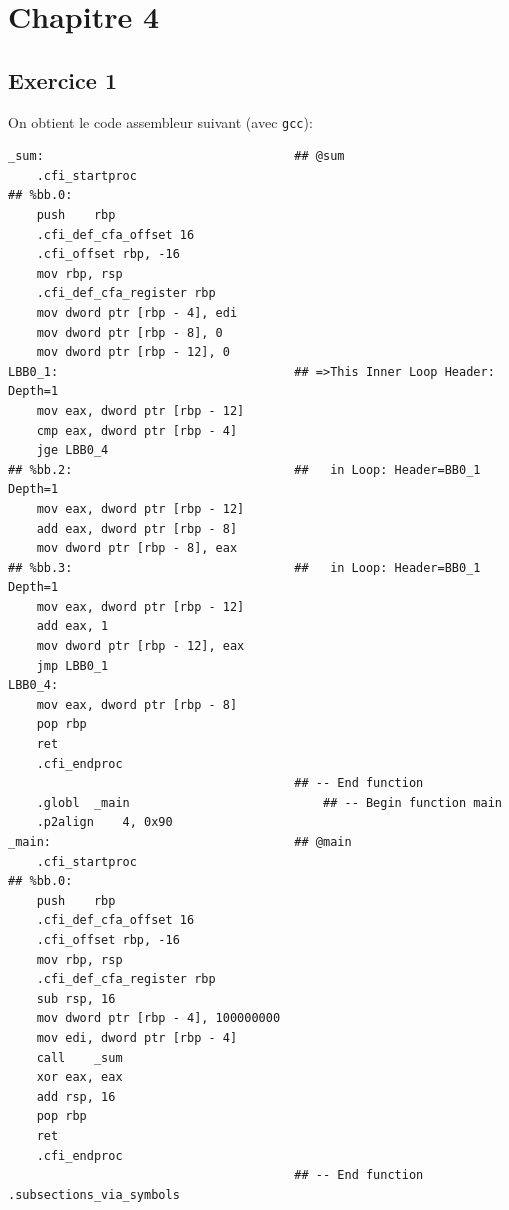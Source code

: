 \documentclass[11pt, a4 paper]{article}
\begin{document}
\begin{figure}[!h]
\end{figure}

\section{Chapitre 4}
\subsection{Exercice 1}
On obtient le code assembleur suivant (avec \texttt{gcc}):
\begin{lstlisting}[style=customasm]
_sum:                                   ## @sum
	.cfi_startproc
## %bb.0:
	push	rbp
	.cfi_def_cfa_offset 16
	.cfi_offset rbp, -16
	mov	rbp, rsp
	.cfi_def_cfa_register rbp
	mov	dword ptr [rbp - 4], edi
	mov	dword ptr [rbp - 8], 0
	mov	dword ptr [rbp - 12], 0
LBB0_1:                                 ## =>This Inner Loop Header: Depth=1
	mov	eax, dword ptr [rbp - 12]
	cmp	eax, dword ptr [rbp - 4]
	jge	LBB0_4
## %bb.2:                               ##   in Loop: Header=BB0_1 Depth=1
	mov	eax, dword ptr [rbp - 12]
	add	eax, dword ptr [rbp - 8]
	mov	dword ptr [rbp - 8], eax
## %bb.3:                               ##   in Loop: Header=BB0_1 Depth=1
	mov	eax, dword ptr [rbp - 12]
	add	eax, 1
	mov	dword ptr [rbp - 12], eax
	jmp	LBB0_1
LBB0_4:
	mov	eax, dword ptr [rbp - 8]
	pop	rbp
	ret
	.cfi_endproc
                                        ## -- End function
	.globl	_main                           ## -- Begin function main
	.p2align	4, 0x90
_main:                                  ## @main
	.cfi_startproc
## %bb.0:
	push	rbp
	.cfi_def_cfa_offset 16
	.cfi_offset rbp, -16
	mov	rbp, rsp
	.cfi_def_cfa_register rbp
	sub	rsp, 16
	mov	dword ptr [rbp - 4], 100000000
	mov	edi, dword ptr [rbp - 4]
	call	_sum
	xor	eax, eax
	add	rsp, 16
	pop	rbp
	ret
	.cfi_endproc
                                        ## -- End function
.subsections_via_symbols
\end{lstlisting}
\end{document}
